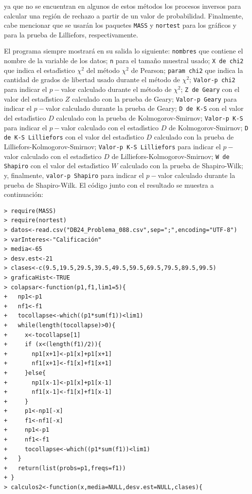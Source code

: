 \begin{solucion}
 ya que no se encuentran en algunos de estos m\'etodos los procesos inversos
 para calcular una regi\'on de rechazo a partir de un valor de probabilidad.
 Finalmente, cabe mencionar que se usar\'an los paquetes \texttt{MASS}
 y \texttt{nortest} para los gr\'aficos y para la prueba de Lilliefors,
 respectivamente.
 \par
 El programa siempre mostrar\'a en su salida lo siguiente:
 \texttt{nombres} que contiene el nombre de la variable de los datos;
 \texttt{n} para el tama\~no muestral usado;
 \texttt{X de chi2} que indica el estad\'{\i}stico $\chi^2$
 del m\'etodo $\chi^2$ de Pearson;
 \texttt{param chi2} que indica la cantidad de grados de libertad
 usado durante el m\'etodo de $\chi^2$;
 \texttt{Valor-p chi2} para indicar el $p-$valor calculado
 durante el m\'etodo de $\chi^2$;
 \texttt{Z de Geary} con el valor del estad\'{\i}stico $Z$
 calculado con la prueba de Geary;
 \texttt{Valor-p Geary} para indicar el $p-$valor calculado
 durante la prueba de Geary;
 \texttt{D de K-S} con el valor del estad\'{\i}stico $D$
 calculado con la prueba de Kolmogorov-Smirnov;
 \texttt{Valor-p K-S} para indicar el $p-$valor calculado
 con el estad\'{\i}stico $D$ de Kolmogorov-Smirnov;
 \texttt{D de K-S Lilliefors} con el valor del estad\'{\i}stico $D$
 calculado con la prueba de Lilliefors-Kolmogorov-Smirnov;
 \texttt{Valor-p K-S Lilliefors} para indicar el $p-$valor calculado
 con el estad\'{\i}stico $D$ de Lilliefors-Kolmogorov-Smirnov;
 \texttt{W de Shapiro} con el valor del estad\'{\i}stico $W$
 calculado con la prueba de Shapiro-Wilk;
 y, finalmente, \texttt{valor-p Shapiro} para indicar el $p-$valor calculado
 durante la prueba de Shapiro-Wilk.
 El c\'odigo junto con el resultado se muestra a continuaci\'on:
 \begin{verbatim}
> require(MASS)
> require(nortest)
> datos<-read.csv("DB24_Problema_088.csv",sep=";",encoding="UTF-8")
> varInteres<-"Calificación"
> media<-65
> desv.est<-21
> clases<-c(9.5,19.5,29.5,39.5,49.5,59.5,69.5,79.5,89.5,99.5)
> graficaHist<-TRUE
> colapsar<-function(p1,f1,lim1=5){
+   np1<-p1
+   nf1<-f1
+   tocollapse<-which((p1*sum(f1))<lim1)
+   while(length(tocollapse)>0){
+     x<-tocollapse[1]
+     if (x<(length(f1)/2)){
+       np1[x+1]<-p1[x]+p1[x+1]
+       nf1[x+1]<-f1[x]+f1[x+1]
+     }else{
+       np1[x-1]<-p1[x]+p1[x-1]
+       nf1[x-1]<-f1[x]+f1[x-1]
+     }
+     p1<-np1[-x]
+     f1<-nf1[-x]
+     np1<-p1
+     nf1<-f1
+     tocollapse<-which((p1*sum(f1))<lim1)
+   }
+   return(list(probs=p1,freqs=f1))  
+ }
> calculos2<-function(x,media=NULL,desv.est=NULL,clases){

\end{verbatim}
\end{solucion}
